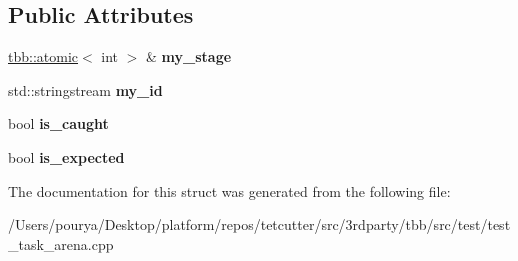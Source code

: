 \subsection*{Public Attributes}
\begin{DoxyCompactItemize}
\item 
\hypertarget{structTestArenaEntryBody_aee50866adcfa9d961caeab45860e5d5c}{}\hyperlink{structtbb_1_1atomic}{tbb\+::atomic}$<$ int $>$ \& {\bfseries my\+\_\+stage}\label{structTestArenaEntryBody_aee50866adcfa9d961caeab45860e5d5c}

\item 
\hypertarget{structTestArenaEntryBody_abf4c45976f66e46edc885c67f478f085}{}std\+::stringstream {\bfseries my\+\_\+id}\label{structTestArenaEntryBody_abf4c45976f66e46edc885c67f478f085}

\item 
\hypertarget{structTestArenaEntryBody_a8c19fa39307809a176b2d6b00376863e}{}bool {\bfseries is\+\_\+caught}\label{structTestArenaEntryBody_a8c19fa39307809a176b2d6b00376863e}

\item 
\hypertarget{structTestArenaEntryBody_a2e9be89bf8a001c8b8df9e849be25540}{}bool {\bfseries is\+\_\+expected}\label{structTestArenaEntryBody_a2e9be89bf8a001c8b8df9e849be25540}

\end{DoxyCompactItemize}


The documentation for this struct was generated from the following file\+:\begin{DoxyCompactItemize}
\item 
/\+Users/pourya/\+Desktop/platform/repos/tetcutter/src/3rdparty/tbb/src/test/test\+\_\+task\+\_\+arena.\+cpp\end{DoxyCompactItemize}
